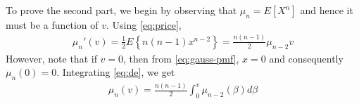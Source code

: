 \documentclass{beamer}
\begin{document}
\begin{frame}
	To prove the second part, we begin by observing that $\mu_n = E[X^n]$ and hence it must be a function of $v$. Using \eqref{eq:price},
	\begin{align}
		\mu_n'(v) = \frac{1}{2}E\left\{n(n - 1)x^{n - 2}\right\} = \frac{n(n - 1)}{2}\mu_{n - 2}{v}
		\label{eq:de}
	\end{align}
	However, note that if $v = 0$, then from \eqref{eq:gauss-pmf}, $x = 0$ and consequently $\mu_n(0) = 0$. Integrating \eqref{eq:de}, we get
	\begin{align}
		\mu_n(v) = \frac{n(n - 1)}{2}\int_{0}^{v}\mu_{n - 2}(\beta)d\beta
		\label{eq:sol2}
	\end{align}
\end{frame}
\end{document}
